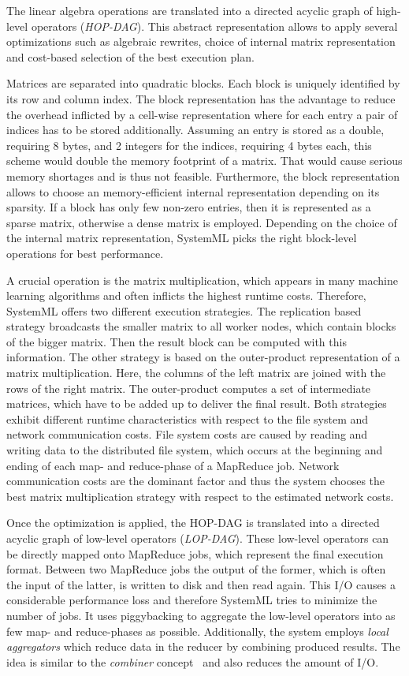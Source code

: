The linear algebra operations are translated into a directed acyclic graph of high-level operators (\emph{HOP-DAG}).
This abstract representation allows to apply several optimizations such as algebraic rewrites, choice of internal matrix representation and cost-based selection of the best execution plan.

Matrices are separated into quadratic blocks.
Each block is uniquely identified by its row and column index.
The block representation has the advantage to reduce the overhead inflicted by a cell-wise representation where for each entry a pair of indices has to be stored additionally.
Assuming an entry is stored as a double, requiring 8 bytes, and 2 integers for the indices, requiring 4 bytes each, this scheme would double the memory footprint of a matrix.
That would cause serious memory shortages and is thus not feasible.
Furthermore, the block representation allows to choose an memory-efficient internal representation depending on its sparsity.
If a block has only few non-zero entries, then it is represented as a sparse matrix, otherwise a dense matrix is employed.
Depending on the choice of the internal matrix representation, SystemML picks the right block-level operations for best performance.

A crucial operation is the matrix multiplication, which appears in many machine learning algorithms and often inflicts the highest runtime costs.
Therefore, SystemML offers two different execution strategies.
The replication based strategy broadcasts the smaller matrix to all worker nodes, which contain blocks of the bigger matrix.
Then the result block can be computed with this information.
The other strategy is based on the outer-product representation of a matrix multiplication.
Here, the columns of the left matrix are joined with the rows of the right matrix.
The outer-product computes a set of intermediate matrices, which have to be added up to deliver the final result.
Both strategies exhibit different runtime characteristics with respect to the file system and network communication costs.
File system costs are caused by reading and writing data to the distributed file system, which occurs at the beginning and ending of each map- and reduce-phase of a MapReduce job.
Network communication costs are the dominant factor and thus the system chooses the best matrix multiplication strategy with respect to the estimated network costs.

Once the optimization is applied, the HOP-DAG is translated into a directed acyclic graph of low-level operators (\emph{LOP-DAG}).
These low-level operators can be directly mapped onto MapReduce jobs, which represent the final execution format.
Between two MapReduce jobs the output of the former, which is often the input of the latter, is written to disk and then read again.
This I/O causes a considerable performance loss and therefore SystemML tries to minimize the number of jobs.
It uses piggybacking to aggregate the low-level operators into as few map- and reduce-phases as possible.
Additionally, the system employs \emph{local aggregators} which reduce data in the reducer by combining produced results.
The idea is similar to the \emph{combiner} concept~\cite{dean:c2008a} and also reduces the amount of I/O.

